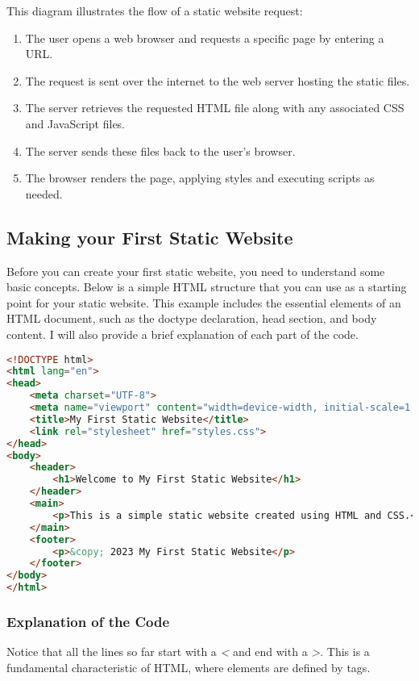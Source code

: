 \vspace*{1cm}

This diagram illustrates the flow of a static website request:
\begin{enumerate}
    \item The user opens a web browser and requests a specific page by entering a URL.\ 
    \item The request is sent over the internet to the web server hosting the static files.
    \item The server retrieves the requested HTML file along with any associated CSS and JavaScript files.
    \item The server sends these files back to the user's browser.
    \item The browser renders the page, applying styles and executing scripts as needed.
\end{enumerate}

\subsection{Making your First Static Website}

Before you can create your first static website, you need to understand some basic concepts. Below is a simple HTML structure that you can use as a starting point for your static website. This example includes the essential elements of an HTML document, such as the doctype declaration, head section, and body content. I will also provide a brief explanation of each part of the code.

\begin{lstlisting}[language=html, caption=Basic HTML Structure]
<!DOCTYPE html>
<html lang="en">
<head>
    <meta charset="UTF-8">
    <meta name="viewport" content="width=device-width, initial-scale=1.0">
    <title>My First Static Website</title>
    <link rel="stylesheet" href="styles.css">
</head>
<body>
    <header>
        <h1>Welcome to My First Static Website</h1>
    </header>
    <main>
        <p>This is a simple static website created using HTML and CSS.</p>
    </main>
    <footer>
        <p>&copy; 2023 My First Static Website</p>
    </footer>
</body>
</html>  
\end{lstlisting}

\subsubsection{Explanation of the Code}

Notice that all the lines so far start with a \textit{<} and end with a \textit{>}. This is a fundamental characteristic of HTML, where elements are defined by tags. 

